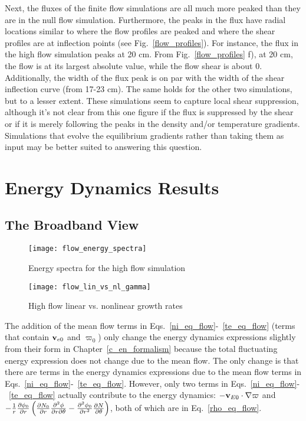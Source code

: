 Next, the fluxes of the finite flow simulations are all much more peaked than they are in the null flow simulation. Furthermore, the peaks in the flux have radial locations similar to
where the flow profiles are peaked and where the shear profiles are at inflection points (see Fig.~\ref{flow_profiles}). For instance, the flux in the high flow simulation peaks at 20 cm.
From Fig.~\ref{flow_profiles} f), at 20 cm, the flow is at its largest absolute value, while the flow shear is about 0. Additionally, the width of the flux peak is on par with the width
of the shear inflection curve (from 17-23 cm). The same holds for the other two simulations, but to a lesser extent. These simulations seem to capture local shear suppression, although it's
not clear from this one figure if the flux is suppressed by the shear or if it is merely following the peaks in the density and/or temperature gradients. Simulations that evolve the equilibrium
gradients rather than taking them as input may be better suited to answering this question.

\section{Energy Dynamics Results}
\label{s_flow_en_dyn}

\subsection{The Broadband View}
\label{ss_broad_view}

\begin{figure}[!ht]
\centerline{\texttt{[image: flow\_energy\_spectra]}}
\caption{Energy spectra for the high flow simulation}
\label{flow_energy_spectra}
\end{figure}

\begin{figure}[!ht]
\centerline{\texttt{[image: flow\_lin\_vs\_nl\_gamma]}}
\caption{High flow linear vs. nonlinear growth rates}
\label{flow_lin_vs_nl_gamma}
\end{figure}

The addition of the mean flow terms in Eqs.~\ref{ni_eq_flow}-~\ref{te_eq_flow} (terms that contain ${\bf v}_{e0}$ and $\varpi_0$) only change the energy dynamics expressions slightly
from their form in Chapter~\ref{c_en_formalism} because the total fluctuating energy expression does not change due to the mean flow. The only change is that there are terms in
the energy dynamics expressions due to the mean flow terms in Eqs.~\ref{ni_eq_flow}-~\ref{te_eq_flow}. However, only two terms in Eqs.~\ref{ni_eq_flow}-~\ref{te_eq_flow} actually
contribute to the energy dynamics: $- {\mathbf v_{E0}} \cdot \nabla \varpi$ and 
$-\frac{1}{r} \frac{\partial\phi_0}{\partial r} \left(\frac{\partial N_0}{\partial r} \frac{\partial^2\phi}{\partial r \partial\theta} - \frac{\partial^2\phi_0}{\partial r^2} \frac{\partial N}{\partial\theta} \right) \nonumber$, both of which are in Eq.~\ref{rho_eq_flow}.

